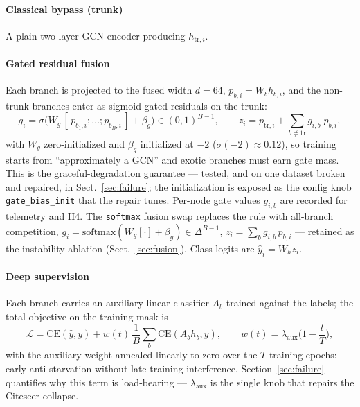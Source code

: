 \documentclass[pdflatex,sn-mathphys-num]{sn-jnl}
\begin{document}
\paragraph{Classical bypass (trunk)} A plain two-layer GCN encoder \cite{kipf2017gcn} producing $h_{\text{tr},i}$.

\paragraph{Gated residual fusion} Each branch is projected to the fused width $d=64$, $p_{b,i} = W_b h_{b,i}$, and the non-trunk branches enter as sigmoid-gated residuals on the trunk:
\begin{equation}
g_i = \sigma\big(W_g\,[\,p_{b_1,i}; \dots ; p_{b_B,i}\,] + \beta_g\big) \in (0,1)^{B-1}, \qquad
z_i = p_{\text{tr},i} + \textstyle\sum_{b \ne \text{tr}} g_{i,b}\; p_{b,i},
\end{equation}
with $W_g$ zero-initialized and $\beta_g$ initialized at $-2$ ($\sigma(-2)\approx0.12$), so training starts from ``approximately a GCN'' and exotic branches must earn gate mass. This is the graceful-degradation guarantee --- tested, and on one dataset broken and repaired, in Sect.~\ref{sec:failure}; the initialization is exposed as the config knob \texttt{gate\_bias\_init} that the repair tunes. Per-node gate values $g_{i,b}$ are recorded for telemetry and H4. The \texttt{softmax} fusion swap replaces the rule with all-branch competition, $g_i = \mathrm{softmax}(W_g[\cdot] + \beta_g) \in \Delta^{B-1}$, $z_i = \sum_b g_{i,b}\,p_{b,i}$ --- retained as the instability ablation (Sect.~\ref{sec:fusion}). Class logits are $\hat{y}_i = W_h z_i$.

\paragraph{Deep supervision} Each branch carries an auxiliary linear classifier $A_b$ trained against the labels; the total objective on the training mask is
\begin{equation}
\mathcal{L} = \mathrm{CE}(\hat{y}, y) + w(t)\,\frac{1}{B}\sum_{b} \mathrm{CE}(A_b h_{b}, y), \qquad
w(t) = \lambda_{\text{aux}}\Big(1 - \frac{t}{T}\Big),
\end{equation}
with the auxiliary weight annealed linearly to zero over the $T$ training epochs: early anti-starvation \cite{lee2015deeply} without late-training interference. Section~\ref{sec:failure} quantifies why this term is load-bearing --- $\lambda_{\text{aux}}$ is the single knob that repairs the Citeseer collapse.
\end{document}
